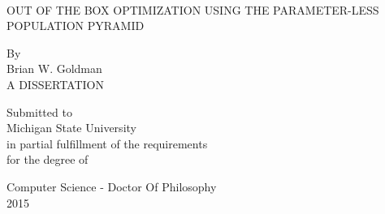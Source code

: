 \documentclass[12pt,letterpaper,twoside]{report}
\newcommand{\MyTitle}{\MakeUppercase{Out of the Box Optimization using the Parameter-less Population Pyramid}}
\begin{document}
\sloppy
{}

\begin{titlepage}
\begin{center}
\ \\[1in]%
\MyTitle\\
\begin{doublespace}
By\\ %
Brian W. Goldman\\[4.5 in]%
A DISSERTATION\\
\end{doublespace}

Submitted to \\ Michigan State University \\ in partial
fulfillment of the requirements \\ for the degree of\\
\begin{doublespace}
Computer Science - Doctor Of Philosophy\\
2015\\
 \end{doublespace}
\end{center}
\end{titlepage}
\newpage







%
%
%
%

%
%
%
\end{document}
